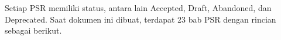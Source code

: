 Setiap PSR memiliki status, antara lain Accepted, Draft, Abandoned, dan Deprecated. Saat dokumen ini dibuat, terdapat 23 bab PSR dengan rincian sebagai berikut.
\begin{comment}
\begin{enumerate}
	\item{Accepted}
	\begin{itemize}
		\item PSR-01: Basic Coding Standard
		\item PSR-03: Logger Interface
		\item PSR-04: Autoloading Standard
		\item PSR-06: Caching Interface
		\item PSR-07: HTTP Message Interface
		\item PSR-11: Container Interface
		\item PSR-12: Extended Coding Style Guide
		\item PSR-13: Hypermedia Links
		\item PSR-14: Event Dispatcher
		\item PSR-15: HTTP Handlers
		\item PSR-16: Simple Cache
		\item PSR-17: HTTP Factories
		\item PSR-18: HTTP Client
		\item PSR-20: Clock
	\end{itemize}

	\item{Draft}
	\begin{itemize}
		\item PSR-05: PHPDoc Standard
		\item PSR-19: PHPDoc Tags
		\item PSR-21: Internationalization
		\item PSR-22: Application Tracing
	\end{itemize}
	
	\item{Abandoned}
	\begin{itemize}
		\item PSR-08: Huggable Interface
		\item PSR-09: Security Advisories
		\item PSR-10: Security Reporting Process
	\end{itemize}
	
	\item{Deprecated}
	\begin{itemize}
		\item PSR-00: Autoloading Standard
		\item PSR-02: Coding Style Guide
	\end{itemize}
	
	
\end{enumerate}
\end{comment}

